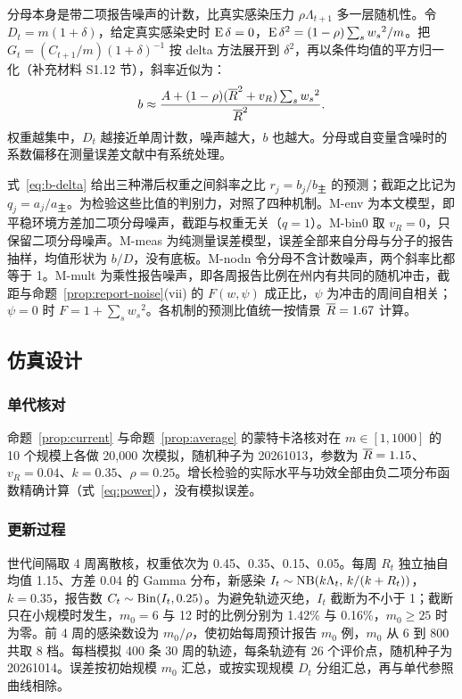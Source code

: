 分母本身是带二项报告噪声的计数，比真实感染压力 $\rho\Lambda_{t+1}$ 多一层随机性。令 $D_t=m(1+\delta)$，给定真实感染史时 $\operatorname{E}\delta=0$，$\operatorname{E}\delta^2=(1-\rho)\sum_s{w_s}^2/m$。把 $G_t=(C_{t+1}/m)(1+\delta)^{-1}$ 按 delta 方法\citep{casella2002statistical}展开到 $\delta^2$，再以条件均值的平方归一化（补充材料 S1.12 节），斜率近似为：
\begin{equation}
  b\approx\frac{A+(1-\rho)(\overline{R}^2+v_R)\sum_s {w_s}^2}{\overline{R}^2}.
  \label{eq:b-delta}
\end{equation}
权重越集中，$D_t$ 越接近单周计数，噪声越大，$b$ 也越大。分母或自变量含噪时的系数偏移在测量误差文献中有系统处理\citep{fuller1987measurement, carroll2006measurement}。

式~\eqref{eq:b-delta} 给出三种滞后权重之间斜率之比 $r_j=b_j/b_{\text{主}}$ 的预测；截距之比记为 $q_j=a_j/a_{\text{主}}$。为检验这些比值的判别力，对照了四种机制。M-env 为本文模型，即平稳环境方差加二项分母噪声，截距与权重无关（$q=1$）。M-bin0 取 $v_R=0$，只保留二项分母噪声。M-meas 为纯测量误差模型，误差全部来自分母与分子的报告抽样，均值形状为 $b/D$，没有底板。M-nodn 令分母不含计数噪声，两个斜率比都等于 1。M-mult 为乘性报告噪声，即各周报告比例在州内有共同的随机冲击，截距与命题~\ref{prop:report-noise}(vii) 的 $F(w,\psi)$ 成正比，$\psi$ 为冲击的周间自相关；$\psi=0$ 时 $F=1+\sum_s{w_s}^2$。各机制的预测比值统一按情景 $\overline{R}=1.67$ 计算。

\subsection{仿真设计}
\label{sec:meth-sim}

\subsubsection{单代核对}

命题~\ref{prop:current} 与命题~\ref{prop:average} 的蒙特卡洛核对在 $m\in[1,1000]$ 的 10 个规模上各做 20,000 次模拟，随机种子为 20261013，参数为 $\overline{R}=1.15$、$v_R=0.04$、$k=0.35$、$\rho=0.25$。增长检验的实际水平与功效全部由负二项分布函数精确计算（式~\eqref{eq:power}），没有模拟误差。

\subsubsection{更新过程}

世代间隔取 4 周离散核，权重依次为 0.45、0.35、0.15、0.05。每周 $R_t$ 独立抽自均值 1.15、方差 0.04 的 Gamma 分布，新感染 $I_t\sim\operatorname{NB}(k\Lambda_t,\,k/(k+R_t))$，$k=0.35$，报告数 $C_t\sim\operatorname{Bin}(I_t,0.25)$。为避免轨迹灭绝，$I_t$ 截断为不小于 1；截断只在小规模时发生，$m_0=6$ 与 12 时的比例分别为 1.42\% 与 0.16\%，$m_0\geq25$ 时为零。前 4 周的感染数设为 $m_0/\rho$，使初始每周预计报告 $m_0$ 例，$m_0$ 从 6 到 800 共取 8 档。每档模拟 400 条 30 周的轨迹，每条轨迹有 26 个评价点，随机种子为 20261014。误差按初始规模 $m_0$ 汇总，或按实现规模 $D_t$ 分组汇总，再与单代参照曲线相除。

